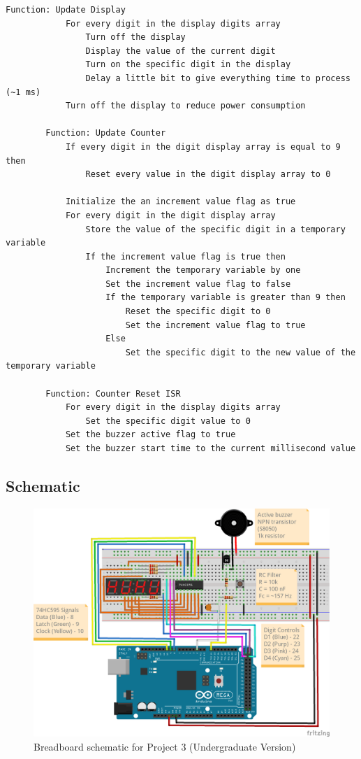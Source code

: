 \begin{lstlisting}[linewidth=1.5\textwidth]
        Function: Update Display
            For every digit in the display digits array
                Turn off the display
                Display the value of the current digit
                Turn on the specific digit in the display
                Delay a little bit to give everything time to process (~1 ms)
            Turn off the display to reduce power consumption

        Function: Update Counter
            If every digit in the digit display array is equal to 9 then
                Reset every value in the digit display array to 0
             
            Initialize the an increment value flag as true
            For every digit in the digit display array
                Store the value of the specific digit in a temporary variable
                If the increment value flag is true then
                    Increment the temporary variable by one
                    Set the increment value flag to false
                    If the temporary variable is greater than 9 then
                        Reset the specific digit to 0
                        Set the increment value flag to true
                    Else
                        Set the specific digit to the new value of the temporary variable
        
        Function: Counter Reset ISR
            For every digit in the display digits array
                Set the specific digit value to 0
            Set the buzzer active flag to true
            Set the buzzer start time to the current millisecond value
    \end{lstlisting}

    \newpage
    \subsection*{Schematic}
    \begin{figure}[ht!]
        \caption{Breadboard schematic for Project 3 (Undergraduate Version)}
        \includegraphics[]{../.secret/project_3_7seg_counter/p3_7seg_counter_ugrad_bb.png}
    \end{figure}

